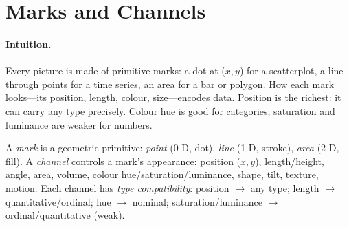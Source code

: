 \section{Marks and Channels}
\label{sec:marks-channels}
\paragraph{Intuition.} Every picture is made of primitive marks: a dot at ($x,y$) for a scatterplot, a line through points for a time series, an area for a bar or polygon. How each mark looks---its position, length, colour, size---encodes data. Position is the richest: it can carry any type precisely. Colour hue is good for categories; saturation and luminance are weaker for numbers.

\begin{definition}\label{def:marks}
A \emph{mark} is a geometric primitive: \emph{point} (0-D, dot), \emph{line} (1-D, stroke), \emph{area} (2-D, fill). A \emph{channel} controls a mark's appearance: position ($x,y$), length/height, angle, area, volume, colour hue/saturation/luminance, shape, tilt, texture, motion. Each channel has \emph{type compatibility}: position $\to$ any type; length $\to$ quantitative/ordinal; hue $\to$ nominal; saturation/luminance $\to$ ordinal/quantitative (weak).
\end{definition}

